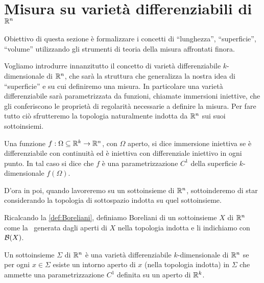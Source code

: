 \section{Misura su varietà differenziabili \texorpdfstring{di $\mathbb R^n$}{}}
Obiettivo di questa sezione è formalizzare i concetti di ``lunghezza'', ``superficie'', ``volume'' utilizzando gli strumenti di teoria della misura affrontati finora. 

Vogliamo introdurre innanzitutto il concetto di varietà differenziabile $k$-dimensionale di $\mathbb R^n$, che sarà la struttura che generalizza la nostra idea di ``superficie'' e su cui definiremo una misura. In particolare una varietà differenziabile sarà parametrizzata da funzioni, chiamate immersioni iniettive, che gli conferiscono le proprietà di regolarità necessarie a definire la misura.
Per fare tutto ciò sfrutteremo la topologia naturalmente indotta da $\mathbb R^n$ sui suoi sottoinsiemi.

\begin{definition}
	Una funzione $f:\Omega \subseteq \mathbb R^k\to\mathbb R^n$, con $\Omega$ aperto, si dice immersione iniettiva se è differenziabile con continuità ed è iniettiva con differenziale iniettivo in ogni punto. In tal caso si dice che $f$ è una parametrizzazione $C^1$ della superficie $k$-dimensionale $f(\Omega)$.
\end{definition}
% 
% 	

D'ora in poi, quando lavoreremo su un sottoinsieme di $\mathbb R^n$, sottoinderemo di star considerando la topologia di sottospazio indotta su quel sottoinsieme.

\begin{definition}\label{def:BorelianiSottoinsieme}
	Ricalcando la \cref{def:Boreliani}, definiamo Boreliani di un sottoinsieme $X$ di $\mathbb R^n$ come la \sigalg\ generata dagli aperti di $X$ nella topologia indotta e li indichiamo con $\mathcal B(X)$.
\end{definition}

\begin{definition}
	Un sottoinsieme $\Sigma$ di $\mathbb R^n$ è una varietà differenziabile $k$-dimensionale di $\mathbb R^n$ se per ogni $x\in\Sigma$ esiste un intorno aperto di $x$ (nella topologia indotta) in $\Sigma$ che ammette una parametrizzazione $C^1$ definita su un aperto di $\mathbb R^k$.
\end{definition}


